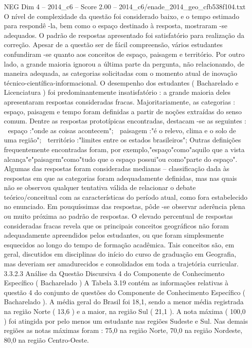 \begin{textsample}{NEG Dim 4 – 2014\_c6 – Score 2.00 – 2014\_c6/enade\_2014\_geo\_cfb538f104.txt}
O nível de complexidade da questão foi considerado baixo, e o tempo estimado para respondê -la, bem como o espaço destinado à resposta, mostraram -se adequados.
O padrão de respostas apresentado foi satisfatório para realização da correção.
Apesar de a questão ser de fácil compreensão, vários estudantes confundiram -se quanto aos conceitos de espaço, paisagem e território.
Por outro lado, a grande maioria ignorou a última parte da pergunta, não relacionando, de maneira adequada, as categorias solicitadas com o momento atual de inovação técnico-científica-informacional.
O desempenho dos estudantes ( Bacharelado e Licenciatura ) foi predominantemente insatisfatório : a grande maioria deles apresentaram respostas consideradas fracas.
Majoritariamente, as categorias : espaço, paisagem e tempo foram definidas a partir de noções extraídas do senso comum.
Dentre as respostas prototípicas encontradas, destacam -se as seguintes :  espaço :"onde as coisas acontecem";  paisagem :"é o relevo, clima e o solo de uma região";  território :"limites entre os estados brasileiros"; Outras definições frequentemente encontradas foram, por exemplo,"espaço"como"aquilo que a vista alcança"e"paisagem"como"tudo que o espaço possui"ou como"parte do espaço".
Algumas das respostas foram consideradas medianas – classificação dada às respostas em que as categorias foram adequadamente definidas, mas nas quais não se observou qualquer tentativa válida de relacionar o debate teórico/conceitual com as características do período atual, como fora estabelecido no enunciado.
Em pouquíssimas das respostas, pôde -se observar aderência plena ou muito próxima ao padrão de respostas.
O elevado percentual de respostas consideradas fracas revela que os principais conceitos geográficos não foram adequadamente apreendidos pelos estudantes, ou que foram simplesmente esquecidos ao longo do tempo de formação acadêmica.
Tais conceitos são, em geral, discutidos em disciplinas do início do curso de graduação em Geografia, mas deveriam ser amadurecidos e consolidados em toda a trajetória curricular. 3.3.2.3 Análise da Questão Discursiva 4 do Componente de Conhecimento Específico ( Bacharelado ) A Tabela 3.19 contém as informações relativas à questão 4 do conjunto de questões do Componente de Conhecimento Específico ( Bacharelado ).
A média geral do Brasil foi 18,1, sendo a menor média registrada na região Norte ( 13,6 ) e a maior, na região Sul ( 21,1 ).
A nota máxima ( 100,0 ) foi atingida por pelo menos um estudante nas regiões Sudeste e Sul.
Nas demais regiões as notas máximas foram : 75,0 na região Norte, 70,0 na região Nordeste, 80,0 na região Centro-Oeste.

\end{textsample}

